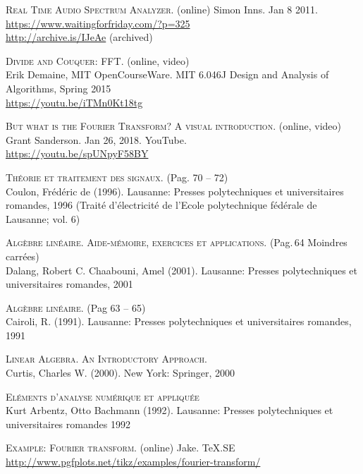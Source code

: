 \listoffigures
\begingroup
\let\clearpage\relax
\vspace{15mm}
\listoftables
\endgroup

\begin{thebibliography}{2}

    \textsc{Real Time Audio Spectrum Analyzer}. (online) 
    Simon Inns. Jan 8 2011. \\
    \url{https://www.waitingforfriday.com/?p=325} \\
    \url{http://archive.is/IJeAe} (archived)

    \textsc{Divide and Couquer: FFT}. (online, video) \\
    Erik Demaine, MIT OpenCourseWare.
    MIT 6.046J Design and Analysis of Algorithms, Spring 2015 \\
    \url{https://youtu.be/iTMn0Kt18tg}

    \textsc{But what is the Fourier Transform? A visual introduction}. (online, video) \\
    Grant Sanderson. Jan 26, 2018. YouTube. \\
    \url{https://youtu.be/spUNpyF58BY}

    \textsc{Théorie et traitement des signaux}. (Pag. 70 -- 72) \\
    Coulon, Frédéric de (1996).
    Lausanne: Presses polytechniques et universitaires romandes, 1996
    (Traité d'électricité de l'Ecole polytechnique fédérale de Lausanne; vol. 6)

    \textsc{Algèbre linéaire. Aide-mémoire, exercices et applications}. (Pag.\,64 Moindres carrées) \\
    Dalang, Robert C. Chaabouni, Amel (2001). 
    Lausanne: Presses polytechniques et universitaires romandes, 2001

    \textsc{Algèbre linéaire}. (Pag 63 -- 65)\\
    Cairoli, R. (1991).
    Lausanne: Presses polytechniques et universitaires romandes, 1991

    \textsc{Linear Algebra. An Introductory Approach.} \\
    Curtis, Charles W. (2000).
    New York: Springer, 2000

    \textsc{El\'ements d'analyse num\'erique et appliqu\'ee} \\
    Kurt Arbentz, Otto Bachmann (1992).
    Lausanne: Presses polytechniques et universitaires romandes 1992

    \textsc{Example: Fourier transform}. (online)
    Jake. TeX.SE \\
    \url{http://www.pgfplots.net/tikz/examples/fourier-transform/}

\end{thebibliography}
